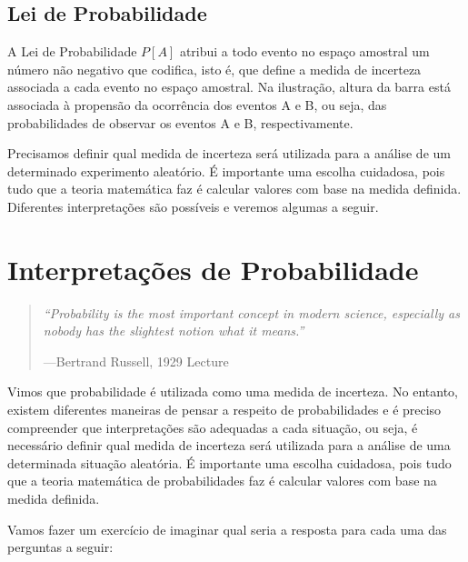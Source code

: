 \documentclass[
]{book}
\theoremstyle{definition}
\theoremstyle{definition}
\theoremstyle{definition}
\theoremstyle{remark}
\begin{document}
\hypertarget{lei-de-probabilidade}{%
\subsection*{Lei de Probabilidade}\label{lei-de-probabilidade}}

A Lei de Probabilidade \(P[A]\) atribui a todo evento no espaço amostral um número não negativo que codifica, isto é, que define a medida de incerteza associada a cada evento no espaço amostral. Na ilustração, altura da barra está associada à propensão da ocorrência dos eventos A e B, ou seja, das probabilidades de observar os eventos A e B, respectivamente.

Precisamos definir qual medida de incerteza será utilizada para a análise de um determinado experimento aleatório. É importante uma escolha cuidadosa, pois tudo que a teoria matemática faz é calcular valores com base na medida definida. Diferentes interpretações são possíveis e veremos algumas a seguir.

\hypertarget{interpretauxe7uxf5es-de-probabilidade}{%
\section{Interpretações de Probabilidade}\label{interpretauxe7uxf5es-de-probabilidade}}

\begin{quote}
\emph{``Probability is the most important concept in modern science, especially as nobody has the slightest notion what it means.''}

---Bertrand Russell, 1929 Lecture
\end{quote}

Vimos que probabilidade é utilizada como uma medida de incerteza. No entanto, existem diferentes maneiras de pensar a respeito de probabilidades e é preciso compreender que interpretações são adequadas a cada situação, ou seja, é necessário definir qual medida de incerteza será utilizada para a análise de uma determinada situação aleatória. É importante uma escolha cuidadosa, pois tudo que a teoria matemática de probabilidades faz é calcular valores com base na medida definida.

Vamos fazer um exercício de imaginar qual seria a resposta para cada uma das perguntas a seguir:
\end{document}
